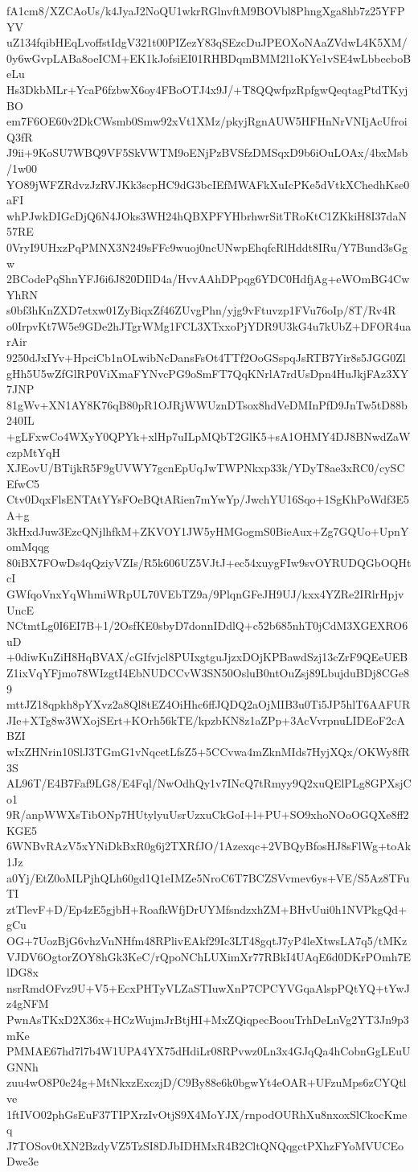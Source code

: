 fA1cm8/XZCAoUs/k4JyaJ2NoQU1wkrRGlnvftM9BOVbl8PhngXga8hb7z25YFPYV
uZ134fqibHEqLvoffstIdgV321t00PIZezY83qSEzcDuJPEOXoNAaZVdwL4K5XM/
0y6wGvpLABa8oeICM+EK1kJofsiEI01RHBDqmBMM2l1oKYe1vSE4wLbbecboBeLu
Hs3DkbMLr+YcaP6fzbwX6oy4FBoOTJ4x9J/+T8QQwfpzRpfgwQeqtagPtdTKyjBO
em7F6OE60v2DkCWsmb0Smw92xVt1XMz/pkyjRgnAUW5HFHnNrVNIjAcUfroiQ3fR
J9ii+9KoSU7WBQ9VF5SkVWTM9oENjPzBVSfzDMSqxD9b6iOuLOAx/4bxMsb/1w00
YO89jWFZRdvzJzRVJKk3scpHC9dG3bcIEfMWAFkXuIcPKe5dVtkXChedhKse0aFI
whPJwkDIGcDjQ6N4JOks3WH24hQBXPFYHbrhwrSitTRoKtC1ZKkiH8I37daN57RE
0VryI9UHxzPqPMNX3N249sFFc9wuoj0ncUNwpEhqfcRlHddt8IRu/Y7Bund3sGgw
2BCodePqShnYFJ6i6J820DIlD4a/HvvAAhDPpqg6YDC0HdfjAg+eWOmBG4CwYhRN
s0bf3hKnZXD7etxw01ZyBiqxZf46ZUvgPhn/yjg9vFtuvzp1FVu76oIp/8T/Rv4R
o0IrpvKt7W5e9GDe2hJTgrWMg1FCL3XTxxoPjYDR9U3kG4u7kUbZ+DFOR4uarAir
9250dJxIYv+HpciCb1nOLwibNcDansFsOt4TTf2OoGSspqJsRTB7Yir8s5JGG0Zl
gHh5U5wZfGlRP0ViXmaFYNvcPG9oSmFT7QqKNrlA7rdUsDpn4HuJkjFAz3XY7JNP
81gWv+XN1AY8K76qB80pR1OJRjWWUznDTsox8hdVeDMInPfD9JnTw5tD88b240IL
+gLFxwCo4WXyY0QPYk+xlHp7uILpMQbT2GlK5+sA1OHMY4DJ8BNwdZaWczpMtYqH
XJEovU/BTijkR5F9gUVWY7gcnEpUqJwTWPNkxp33k/YDyT8ae3xRC0/cySCEfwC5
Ctv0DqxFlsENTAtYYsFOeBQtARien7mYwYp/JwchYU16Sqo+1SgKhPoWdf3E5A+g
3kHxdJuw3EzcQNjlhfkM+ZKVOY1JW5yHMGogmS0BieAux+Zg7GQUo+UpnYomMqqg
80iBX7FOwDs4qQziyVZIs/R5k606UZ5VJtJ+ec54xuygFIw9svOYRUDQGbOQHtcI
GWfqoVnxYqWhmiWRpUL70VEbTZ9a/9PlqnGFeJH9UJ/kxx4YZRe2IRlrHpjvUncE
NCtmtLg0I6EI7B+1/2OsfKE0sbyD7donnIDdlQ+c52b685nhT0jCdM3XGEXRO6uD
+0diwKuZiH8HqBVAX/cGIfvjcl8PUIxgtguJjzxDOjKPBawdSzj13cZrF9QEeUEB
Z1ixVqYFjmo78WIzgtI4EbNUDCCvW3SN50OsluB0ntOuZsj89LbujduBDj8CGe89
mttJZ18qpkh8pYXvz2a8Ql8tEZ4OiHhc6ffJQDQ2aOjMIB3u0Ti5JP5hlT6AAFUR
JIe+XTg8w3WXojSErt+KOrh56kTE/kpzbKN8z1aZPp+3AcVvrpnuLIDEoF2cABZI
wIxZHNrin10SlJ3TGmG1vNqcetLfsZ5+5CCvwa4mZknMIds7HyjXQx/OKWy8fR3S
AL96T/E4B7Faf9LG8/E4Fql/NwOdhQy1v7INcQ7tRmyy9Q2xuQElPLg8GPXsjCo1
9R/anpWWXsTibONp7HUtylyuUsrUzxuCkGoI+l+PU+SO9xhoNOoOGQXe8ff2KGE5
6WNBvRAzV5xYNiDkBxR0g6j2TXRfJO/1Azexqc+2VBQyBfosHJ8sFlWg+toAk1Jz
a0Yj/EtZ0oMLPjhQLh60gd1Q1eIMZe5NroC6T7BCZSVvmev6ys+VE/S5Az8TFuTI
ztTlevF+D/Ep4zE5gjbH+RoafkWfjDrUYMfsndzxhZM+BHvUui0h1NVPkgQd+gCu
OG+7UozBjG6vhzVnNHfm48RPlivEAkf29Ic3LT48gqtJ7yP4leXtwsLA7q5/tMKz
VJDV6OgtorZOY8hGk3KeC/rQpoNChLUXimXr77RBkI4UAqE6d0DKrPOmh7ElDG8x
nsrRmdOFvz9U+V5+EcxPHTyVLZaSTIuwXnP7CPCYVGqaAlspPQtYQ+tYwJz4gNFM
PwnAsTKxD2X36x+HCzWujmJrBtjHI+MxZQiqpecBoouTrhDeLnVg2YT3Jn9p3mKe
PMMAE67hd7l7b4W1UPA4YX75dHdiLr08RPvwz0Ln3x4GJqQa4hCobnGgLEuUGNNh
zuu4wO8P0e24g+MtNkxzExczjD/C9By88e6k0bgwYt4eOAR+UFzuMps6zCYQtlve
1ftIVO02phGsEuF37TIPXrzIvOtjS9X4MoYJX/rnpodOURhXu8nxoxSlCkocKmeq
J7TOSov0tXN2BzdyVZ5TzSI8DJbIDHMxR4B2CltQNQqgctPXhzFYoMVUCEoDwe3e

